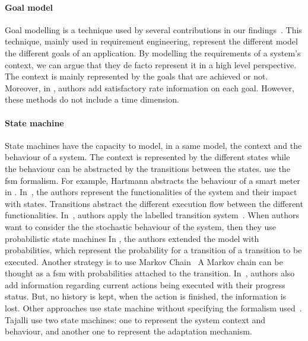 \paragraph{Goal model}
Goal modelling is a technique used by several contributions in our findings~\cite{DBLP:conf/icse/CailliauL17, DBLP:conf/icse/IftikharW14a, DBLP:conf/icse/MendoncaAR14, DBLP:conf/icse/ChenPYNZ14, DBLP:conf/re/BaresiPS10}.
This technique, mainly used in requirement engineering, represent the different model the different goals of an application.
By modelling the requirements of a system's context, we can argue that they de facto represent it in a high level perspective.
The context is mainly represented by the goals that are achieved or not.
Moreover, in \cite{DBLP:conf/icse/CailliauL17}, authors add satisfactory rate information on each goal.
However, these methods do not include a time dimension.

\paragraph{State machine}
State machines have the capacity to model, in a same model, the context and the behaviour of a system.
The context is represented by the different states while the behaviour can be abstracted by the transitions between the states.
\cite{DBLP:conf/smartgridsec/0001FKNT14, DBLP:conf/icse/IftikharW14a, DBLP:conf/icse/ArcainiRS15, DBLP:conf/rv/ArcainiGR11, DBLP:conf/icse/GhezziPST13} use the \gls{fsm} formalism.
For example, Hartmann \etal abstracts the behaviour of a smart meter in \cite{DBLP:conf/smartgridsec/0001FKNT14}.
In~\cite{DBLP:conf/icse/GhezziPST13}, the authors represent the functionalities of the system and their impact with states.
Transitions abstract the different execution flow between the different functionalities.
In~\cite{DBLP:conf/icse/BarbosaLMJ17, DBLP:journals/computing/BencomoBGBI13}, authors apply the labelled transition system~\cite{DBLP:journals/cacm/Keller76}.
When authors want to consider the the stochastic behaviour of the system, then they use probabilistic state machines
In \cite{DBLP:conf/icse/BarbosaLMJ17}, the authors extended  the model with probabilities, which represent the probability for a transition of a transition to be executed.
Another strategy is to use Markov Chain~\cite{DBLP:conf/sigsoft/MorenoCGS15, DBLP:conf/kbse/FilieriGLM11, DBLP:conf/dagstuhl/GhezziS10, DBLP:conf/icse/DuarteMS18}
A Markov chain can be thought as a \gls{fsm} with probabilities attached to the transition.
In~\cite{DBLP:conf/sigsoft/MorenoCGS15}, authors also add information regarding current actions being executed with their progress status.
But, no history is kept, when the action is finished, the information is lost.
Other approaches use state machine without specifying the formalism used~\cite{DBLP:conf/wetice/DjoudiBZ14, DBLP:conf/aosd/ZhangGC09, DBLP:conf/kbse/TajalliGEM10}.
Tajalli \etal use two state machines: one to represent the system context and behaviour, and another one to represent the adaptation mechanism.

